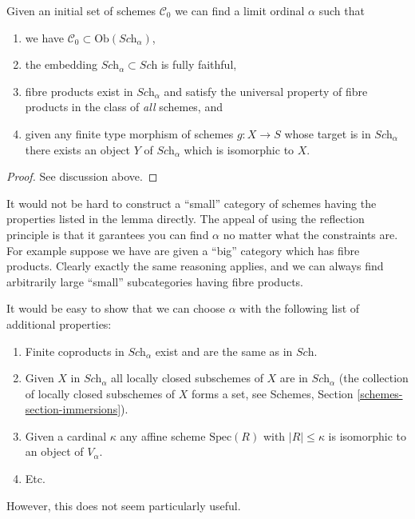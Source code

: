 \begin{lemma}
\label{lemma-create-category-schemes}
Given an initial set of schemes $\mathcal{C}_0$ we can find a limit ordinal
$\alpha$ such that
\begin{enumerate}
\item we have $\mathcal{C}_0 \subset \text{Ob}(\textit{Sch}_\alpha)$,
\item the embedding $\textit{Sch}_\alpha \subset \textit{Sch}$ is
fully faithful,
\item fibre products exist in $\textit{Sch}_\alpha$ and satisfy
the universal property of fibre products in the class of {\it all} schemes, and
\item given any finite type morphism of schemes $g : X \to S$
whose target is in $\textit{Sch}_\alpha$ there exists an
object $Y$ of $\textit{Sch}_\alpha$ which is isomorphic to $X$.
\end{enumerate}
\end{lemma}

\begin{proof}
See discussion above.
\end{proof}

\noindent
It would not be hard to construct a ``small'' category of schemes
having the properties listed in the lemma directly. The appeal of
using the reflection principle is that it garantees you can find
$\alpha$ no matter what the constraints are. For example
suppose we have are given a ``big'' category which has fibre products.
Clearly exactly the same reasoning applies, and we can always
find arbitrarily large ``small'' subcategories having fibre
products.

\begin{remark}
\label{remark-more-schemes}
It would be easy to show that we can choose $\alpha$ with the following
list of additional properties:
\begin{enumerate}
\item Finite coproducts in $\textit{Sch}_\alpha$
exist and are the same as in $\textit{Sch}$.
\item Given $X$ in $\textit{Sch}_\alpha$ all locally closed subschemes
of $X$ are in $\textit{Sch}_\alpha$ (the collection of locally closed
subschemes of $X$ forms a set, see
Schemes, Section \ref{schemes-section-immersions}).
\item Given a cardinal $\kappa$ any affine scheme $\text{Spec}(R)$ 
with $|R| \leq \kappa$ is isomorphic to an object of $V_\alpha$.
\item Etc.
\end{enumerate}
However, this does not seem particularly useful.
\end{remark}

